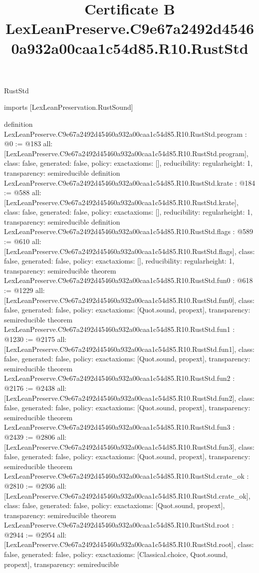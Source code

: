 \begin{lexlean}{RustStd}
\title{Certificate B LexLeanPreserve.C9e67a2492d45460a932a00caa1c54d85.R10.RustStd}
\begin{coremodule}
imports [LexLeanPreservation.RustSound]

definition LexLeanPreserve.C9e67a2492d45460a932a00caa1c54d85.R10.RustStd.program : @0 := @183 {
  all: [LexLeanPreserve.C9e67a2492d45460a932a00caa1c54d85.R10.RustStd.program],
  class: false,
  generated: false,
  policy: exact{axioms: []},
  reducibility: regular{height: 1},
  transparency: semireducible
}
definition LexLeanPreserve.C9e67a2492d45460a932a00caa1c54d85.R10.RustStd.krate : @184 := @588 {
  all: [LexLeanPreserve.C9e67a2492d45460a932a00caa1c54d85.R10.RustStd.krate],
  class: false,
  generated: false,
  policy: exact{axioms: []},
  reducibility: regular{height: 1},
  transparency: semireducible
}
definition LexLeanPreserve.C9e67a2492d45460a932a00caa1c54d85.R10.RustStd.flags : @589 := @610 {
  all: [LexLeanPreserve.C9e67a2492d45460a932a00caa1c54d85.R10.RustStd.flags],
  class: false,
  generated: false,
  policy: exact{axioms: []},
  reducibility: regular{height: 1},
  transparency: semireducible
}
theorem LexLeanPreserve.C9e67a2492d45460a932a00caa1c54d85.R10.RustStd.fun0 : @618 := @1229 {
  all: [LexLeanPreserve.C9e67a2492d45460a932a00caa1c54d85.R10.RustStd.fun0],
  class: false,
  generated: false,
  policy: exact{axioms: [Quot.sound, propext]},
  transparency: semireducible
}
theorem LexLeanPreserve.C9e67a2492d45460a932a00caa1c54d85.R10.RustStd.fun1 : @1230 := @2175 {
  all: [LexLeanPreserve.C9e67a2492d45460a932a00caa1c54d85.R10.RustStd.fun1],
  class: false,
  generated: false,
  policy: exact{axioms: [Quot.sound, propext]},
  transparency: semireducible
}
theorem LexLeanPreserve.C9e67a2492d45460a932a00caa1c54d85.R10.RustStd.fun2 : @2176 := @2438 {
  all: [LexLeanPreserve.C9e67a2492d45460a932a00caa1c54d85.R10.RustStd.fun2],
  class: false,
  generated: false,
  policy: exact{axioms: [Quot.sound, propext]},
  transparency: semireducible
}
theorem LexLeanPreserve.C9e67a2492d45460a932a00caa1c54d85.R10.RustStd.fun3 : @2439 := @2806 {
  all: [LexLeanPreserve.C9e67a2492d45460a932a00caa1c54d85.R10.RustStd.fun3],
  class: false,
  generated: false,
  policy: exact{axioms: [Quot.sound, propext]},
  transparency: semireducible
}
theorem LexLeanPreserve.C9e67a2492d45460a932a00caa1c54d85.R10.RustStd.crate_ok : @2810 := @2936 {
  all: [LexLeanPreserve.C9e67a2492d45460a932a00caa1c54d85.R10.RustStd.crate_ok],
  class: false,
  generated: false,
  policy: exact{axioms: [Quot.sound, propext]},
  transparency: semireducible
}
theorem LexLeanPreserve.C9e67a2492d45460a932a00caa1c54d85.R10.RustStd.root : @2944 := @2954 {
  all: [LexLeanPreserve.C9e67a2492d45460a932a00caa1c54d85.R10.RustStd.root],
  class: false,
  generated: false,
  policy: exact{axioms: [Classical.choice, Quot.sound, propext]},
  transparency: semireducible
}


\end{coremodule}
\end{lexlean}
